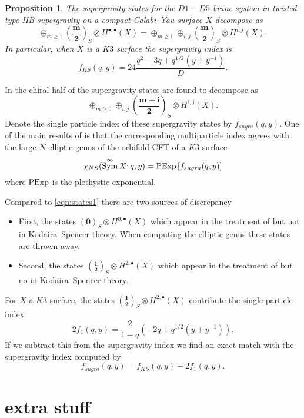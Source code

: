 \documentclass[11pt]{amsart}
\DeclareMathOperator{\Sym}{Sym} \DeclareMathOperator{\Hom}{Hom}
\newcommand\beqn{\begin{equation}}
\newcommand\eeqn{\end{equation}}
\newcommand{\bu}{\bullet}
\theoremstyle{thm}
\newtheorem{prop}[theorem]{Proposition}
\numberwithin{equation}{subsection}
\theoremstyle{def}
\theoremstyle{rem}
\begin{document}
\begin{prop} 
The supergravity states for the $D1-D5$ brane system in twisted type IIB supergravity on a compact Calabi--Yau surface $X$ decompose as
\beqn\label{eqn:states1}
\oplus_{m \geq 1} \left(\mathbf{\frac{m}{2}}\right)_S  \otimes H^{\bu,\bu}(X) = \oplus_{m \geq 1} \oplus_{i,j} \left(\mathbf{\frac{m}{2}}\right)_S  \otimes H^{i,j}(X) .
\eeqn
In particular, when $X$ is a $K3$ surface the supergravity index is 
\beqn\label{eqn:sugra_index}
f_{KS}(q,y) = 24 \frac{q^2 - 3 q + q^{1/2}(y+y^{-1})}{D} .
\eeqn
\end{prop}

In \cite{dB1} the chiral half of the supergravity states are found to decompose as
\beqn
\oplus_{m \geq 0} \oplus_{i,j} \left(\mathbf{\frac{m+i}{2}}\right)_S  \otimes H^{i,j}(X) .
\eeqn
Denote the single particle index of these supergravity states by $f_{sugra}(q,y)$. 
One of the main results of \cite{dB1} is that the corresponding multiparticle index agrees with the large $N$ elliptic genus of the orbifold CFT of a $K3$ surface
\beqn
\chi_{NS}(\Sym^\infty X ; q,y) = {\rm PExp} \left[f_{sugra}(q,y) \right]
\eeqn
where ${\rm PExp}$ is the plethystic exponential.

Compared to \eqref{eqn:states1} there are two sources of discrepancy
\begin{itemize} 
\item First, the states $(\mathbf{0})_S \otimes H^{0,\bu}(X)$ which appear in the treatment of \cite{dB1} but not in Kodaira--Spencer theory.
When computing the elliptic genus these states are thrown away. 
\item Second, the states $(\mathbf{\frac12})_S \otimes H^{2,\bu}(X)$ which appear in the treatment of \cite{dB1} but no in Kodaira--Spencer theory. 
\end{itemize} 

For $X$ a $K3$ surface, the states $(\mathbf{\frac12})_S \otimes H^{2,\bu}(X)$ contribute the single particle index
\beqn
2 f_1 (q,y) = \frac{2}{1-q}\left(-2 q + q^{1/2}(y+y^{-1})\right) .
\eeqn
If we subtract this from the supergravity index we find an exact match with the supergravity index computed by \cite{dB1}
\beqn
f_{sugra}(q,y) = f_{KS}(q,y) - 2 f_1(q,y) .
\eeqn


\appendix

\section{extra stuff}
\end{document}
